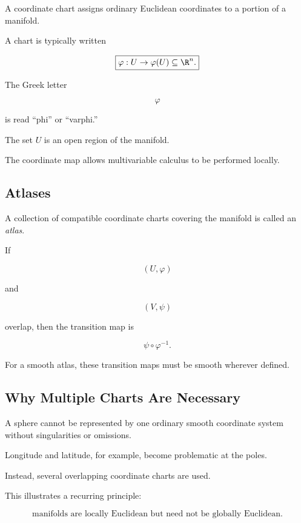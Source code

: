 A coordinate chart assigns ordinary Euclidean coordinates to a portion of a
manifold.

A chart is typically written

\[
\boxed{
\varphi:U\to\varphi(U)\subseteq\R^n.
}
\]

The Greek letter

\[
\varphi
\]

is read ``phi'' or ``varphi.''

The set \(U\) is an open region of the manifold.

The coordinate map allows multivariable calculus to be performed locally.

\subsection{Atlases}
\label{subsec:manifold-atlas}

A collection of compatible coordinate charts covering the manifold is
called an \emph{atlas}.

If

\[
(U,\varphi)
\]

and

\[
(V,\psi)
\]

overlap, then the transition map is

\[
\boxed{
\psi\circ\varphi^{-1}.
}
\]

For a smooth atlas, these transition maps must be smooth wherever defined.

\subsection{Why Multiple Charts Are Necessary}
\label{subsec:why-multiple-charts}

A sphere cannot be represented by one ordinary smooth coordinate system
without singularities or omissions.

Longitude and latitude, for example, become problematic at the poles.

Instead, several overlapping coordinate charts are used.

This illustrates a recurring principle:

\[
\boxed{
\text{manifolds are locally Euclidean but need not be globally Euclidean.}
}
\]


